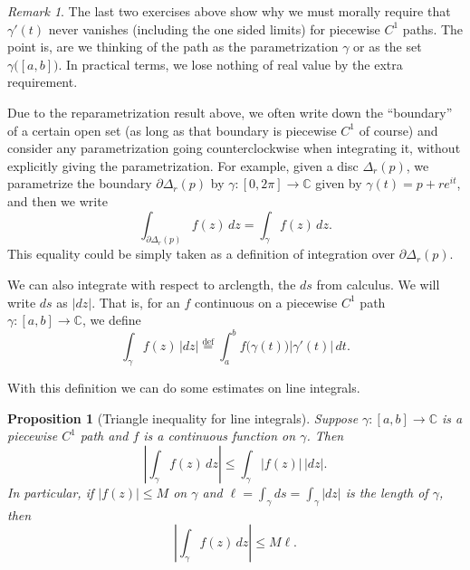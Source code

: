 \documentclass[12pt,openany]{book}
\newcommand{\sabs}[1]{\lvert {#1} \rvert}
\newcommand{\abs}[1]{\left\lvert {#1} \right\rvert}
\newcommand{\C}{{\mathbb{C}}}
\theoremstyle{plain}
\newtheorem{prop}[thm]{Proposition}
\theoremstyle{remark}
\newtheorem{remark}[thm]{Remark}
\theoremstyle{definition}
\theoremstyle{exercise}
\theoremstyle{example}
\begin{document}
\begin{remark}
The last two exercises above show why we must morally
require that $\gamma'(t)$ never vanishes (including the one sided limits)
for piecewise $C^1$ paths.  The point is, are we thinking of the path
as the parametrization $\gamma$ or as the set $\gamma\bigl([a,b]\bigr)$.
In practical terms, we lose nothing of real value by the extra requirement.
\end{remark}

Due to the reparametrization result above,
we often write down the ``boundary'' of a certain open set
(as long as that boundary is piecewise $C^1$ of course)
and consider any parametrization going counterclockwise
when integrating it, without explicitly giving the parametrization.
For example, given a disc $\Delta_r(p)$, we parametrize
the boundary $\partial \Delta_r(p)$ by
$\gamma  \colon [0,2\pi] \to \C$ given by $\gamma(t) = p +
re^{it}$, and then we write
\begin{equation*}
\int_{\partial \Delta_r(p)} f(z) \, dz
=
\int_{\gamma} f(z) \, dz .
\end{equation*}
This equality could be simply taken as a definition of integration over
$\partial \Delta_r(p)$.

\medskip

We can also integrate with respect to arclength, the $ds$ from calculus.
We will write $ds$ as $\sabs{dz}$.  That is, for an $f$ continuous on
a piecewise $C^1$ path $\gamma \colon [a,b] \to \C$,
we define
\begin{equation*}
\int_\gamma f(z) \, \sabs{dz}
\overset{\text{def}}{=}
\int_a^b f\bigl( \gamma(t) \bigr) \sabs{\gamma'(t)} \, dt .
\end{equation*}

With this definition we can do some estimates on line integrals.

\begin{prop}[Triangle inequality for line integrals]%
Suppose $\gamma \colon [a,b] \to \C$ is 
a piecewise $C^1$ path and $f$ is a continuous function on
$\gamma$.  Then
\begin{equation*}
\abs{\int_\gamma f(z) \, dz} \leq \int_\gamma \sabs{f(z)} \, \sabs{dz} .
\end{equation*}
In particular, if $\sabs{f(z)} \leq M$ on $\gamma$ and $\ell = \int_\gamma ds
= \int_{\gamma} \sabs{dz}$ is the length of $\gamma$, then
\begin{equation*}
\abs{\int_\gamma f(z) \, dz} \leq M \ell .
\end{equation*}
\end{prop} 
\end{document}
